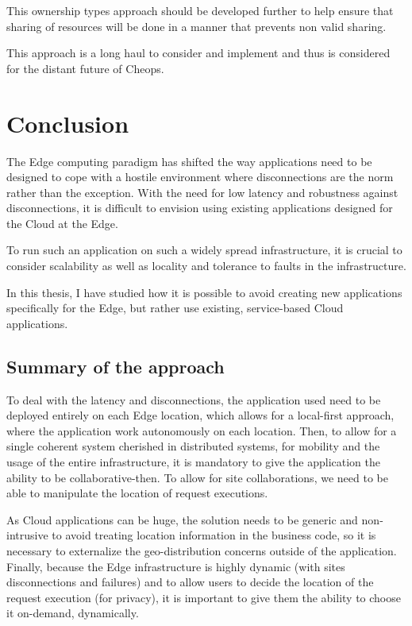 This ownership types approach should be developed further to help
ensure that sharing of resources will be done in a manner that
prevents non valid sharing.

This approach is a long haul to consider and implement and thus is
considered for the distant future of Cheops.



\chapter{Conclusion} %


The Edge computing paradigm has shifted the way applications need to
be designed to cope with a hostile environment where disconnections
are the norm rather than the exception.
%
With the need for low latency and robustness against disconnections,
it is difficult to envision using existing applications designed for
the Cloud at the Edge.

To run such an application on such a widely spread infrastructure, it
is crucial to consider scalability as well as locality and tolerance
to faults in the infrastructure.

In this thesis, I have studied how it is possible to avoid creating
new applications specifically for the Edge, but rather use existing,
service-based Cloud applications.


\section*{Summary of the approach}

To deal with the latency and disconnections, the application used need
to be deployed entirely on each Edge location, which allows for a
local-first approach, where the application work autonomously on each
location.
%
Then, to allow for a single coherent system cherished in distributed
systems, for mobility and the usage of the entire infrastructure, it
is mandatory to give the application the ability to be
collaborative-then.
%
To allow for site collaborations, we need to be able to manipulate the
location of request executions.

As Cloud applications can be huge, the solution needs to be generic
and non-intrusive to avoid treating location information in the
business code, so it is necessary to externalize the geo-distribution
concerns outside of the application.
%
Finally, because the Edge infrastructure is highly dynamic (with sites
disconnections and failures) and to allow users to decide the location
of the request execution (\eg for privacy), it is important to give
them the ability to choose it on-demand, dynamically.

